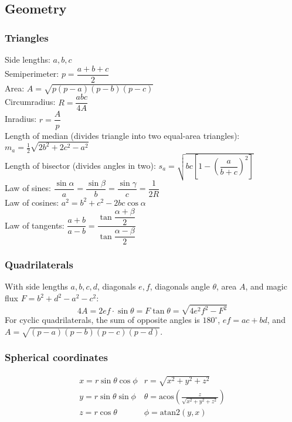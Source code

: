 \documentclass[a4paper,11pt,oneside]{article}
\begin{document}
\begin{multicols*}{\COLS}
\subsection{\small Geometry}
\subsubsection{\small Triangles}
Side lengths: $a, b, c$\\
Semiperimeter: $p = \dfrac{a + b + c}{2}$\\
Area: $A = \sqrt{p(p - a)(p - b)(p - c)}$\\
Circumradius: $R = \dfrac{abc}{4A}$\\
Inradius: $r = \dfrac{A}{p}$\\
Length of median (divides triangle into two equal-area triangles): $m_a = \frac{1}{2} \sqrt{2b^2 + 2c^2 - a^2}$\\
Length of bisector (divides angles in two): $s_a = \sqrt{bc \left[ 1 - \left( \dfrac{a}{b+c} \right)^2 \right]}$\\
Law of sines: $\dfrac{\sin \alpha}{a} = \dfrac{\sin \beta}{b} = \dfrac{\sin \gamma}{c} = \dfrac{1}{2R}$\\
Law of cosines: $a^2 = b^2 + c^2 - 2bc \cos \alpha$\\
Law of tangents: $\dfrac{a + b}{a - b} = \dfrac{\tan \dfrac{\alpha + \beta}{2}}{\tan \dfrac{\alpha - \beta}{2}}$

\subsubsection{\small Quadrilaterals}
With side lengths $a, b, c, d$, diagonals $e, f$, diagonals angle $\theta$, area $A$, and magic flux $F = b^2 + d^2 - a^2 - c^2$:
\[
4A = 2ef \cdot \sin \theta = F \tan \theta = \sqrt{4e^2 f^2 - F^2}
\]
For cyclic quadrilaterals, the sum of opposite angles is $180^\circ$, $ef = ac + bd$, and $A = \sqrt{(p - a)(p - b)(p - c)(p - d)}$.

\subsubsection{\small Spherical coordinates}
\[
\begin{array}{cc}
x = r \sin \theta \cos \phi & r = \sqrt{x^2 + y^2 + z^2} \\
y = r \sin \theta \sin \phi & \theta = \text{acos}\left( \frac{z}{\sqrt{x^2 + y^2 + z^2}} \right) \\
z = r \cos \theta & \phi = \text{atan2}(y, x)
\end{array}
\]


\end{multicols*}
\end{document}
